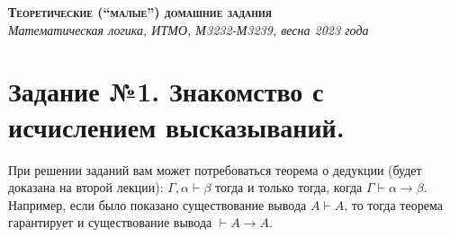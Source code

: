 \documentclass[10pt,a4paper,oneside]{article}
\begin{document}
\begin{center}{\Large\textsc{\textbf{Теоретические (``малые'') домашние задания}}}\\
             \it Математическая логика, ИТМО, М3232-М3239, весна 2023 года\end{center}

\section*{Задание №1. Знакомство с исчислением высказываний.}


При решении заданий вам может потребоваться теорема о дедукции (будет доказана на второй лекции): 
$\Gamma, \alpha \vdash \beta$ 
тогда и только тогда, когда $\Gamma \vdash \alpha\rightarrow\beta$. Например, если было показано 
существование вывода $A \vdash A$, то тогда теорема гарантирует и существование вывода $\vdash A \rightarrow A$.
\end{document}
